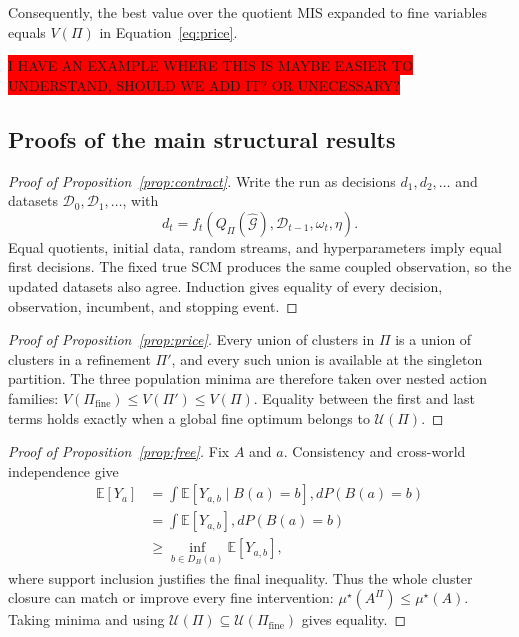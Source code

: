 \documentclass[twoside]{article}
\newcommand{\E}{\mathbb{E}}
\begin{document}
Consequently, the best value over the quotient MIS expanded to fine variables equals $V(\Pi)$ in Equation~\eqref{eq:price}.

\colorbox{red}{I HAVE AN EXAMPLE WHERE THIS IS MAYBE EASIER TO UNDERSTAND, SHOULD WE ADD IT? OR UNECESSARY?}

\subsection{Proofs of the main structural results}

\begin{proof}[Proof of Proposition~\ref{prop:contract}]
Write the run as decisions $d_1,d_2,\ldots$ and datasets
$\mathcal D_0,\mathcal D_1,\ldots$, with
\[
d_t=f_t\!\left(Q_\Pi(\widehat{\mathcal G}),\mathcal D_{t-1},\omega_t,\eta\right).
\] 
Equal quotients, initial data, random streams, and hyperparameters imply equal first decisions. The fixed true SCM produces the same coupled observation, so the updated datasets also agree. Induction gives equality of every decision, observation, incumbent, and stopping event.
\end{proof}

\begin{proof}[Proof of Proposition~\ref{prop:price}]
Every union of clusters in $\Pi$ is a union of clusters in a refinement $\Pi'$, and every such union is available at the singleton partition. The three population minima are therefore taken over nested action families: $V(\Pi_{\mathrm{fine}})\le V(\Pi')\le V(\Pi)$. Equality between the first and last terms holds exactly when a global fine optimum belongs to $\mathcal U(\Pi)$.
\end{proof}

\begin{proof}[Proof of Proposition~\ref{prop:free}]
Fix $A$ and $a$. Consistency and cross-world independence give
\[
\begin{aligned}
 \E[Y_a]
 &=\int \E[Y_{a,b}\mid B(a)=b],dP(B(a)=b)\\
 &=\int \E[Y_{a,b}],dP(B(a)=b)\\
 &\ge \inf_{b\in D_B(a)}\E[Y_{a,b}],
\end{aligned}
\]
where support inclusion justifies the final inequality. Thus the whole cluster closure can match or improve every fine intervention: $\mu^\star(A^\Pi)\le\mu^\star(A)$. Taking minima and using $\mathcal U(\Pi)\subseteq\mathcal U(\Pi_{\mathrm{fine}})$ gives equality.
\end{proof}
\end{document}
